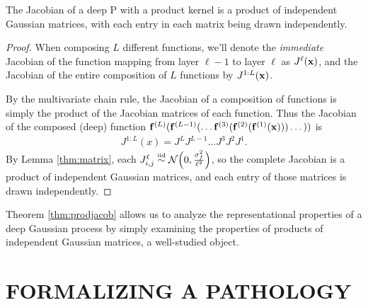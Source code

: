 \documentclass[twoside]{article}
\makeatletter
\newcommand{\fdeep}{\vf^{(1:L)}}
\newlength{\nonHumbleHeight}
\def\@humbleformat#1{{\settoheight{\nonHumbleHeight}{#1}\resizebox{!}{0.94\nonHumbleHeight}{#1}}}%
\def\humble#1{\@humbleformat{#1}}%
\newcommand{\gp}{{\humble GP}}
\newcommand{\sectiondist}{}
\makeatother
\begin{document}
\begin{theorem}
\label{thm:prodjacob}
The Jacobian of a deep \gp{} with a product kernel is a product of independent Gaussian matrices, with each entry in each matrix being drawn independently.
\end{theorem}
%
\begin{proof}
When composing $L$ different functions, we'll denote the \emph{immediate} Jacobian of the function mapping from layer $\ell -1$ to layer $\ell$ as $J^\ell({\bf{x}})$, and the Jacobian of the entire composition of $L$ functions by $J^{1:L}({\bf{x}})$.

By the multivariate chain rule, the Jacobian of a composition of functions is simply the product of the Jacobian matrices of each function.  
%
Thus the Jacobian of the composed (deep) function ${\bf{f}}^{(L)}({\bf{f}}^{(L-1)}(\dots {\bf{f}}^{(3)}( {\bf{f}}^{(2)}( {\bf{f}}^{(1)}({\bf{x}})))\dots))$ is
%
\begin{align}
 J^{1:L}(x) 
= J^L J^{L-1} \dots J^3 J^2 J^1. 
\end{align}
%
By Lemma \ref{thm:matrix}, each ${J^\ell_{i,j} \simiid \Nt{0}{\frac{\sigma^2_f}{\ell^2}}}$, so the complete Jacobian is a product of independent Gaussian matrices, and each entry of those matrices is drawn independently.
\end{proof}

\vspace{-0.1in}
Theorem \ref{thm:prodjacob} allows us to analyze the representational properties of a deep Gaussian process by simply examining the properties of products of independent Gaussian matrices, a well-studied object.





\section{FORMALIZING A PATHOLOGY}
\sectiondist

\end{document}

